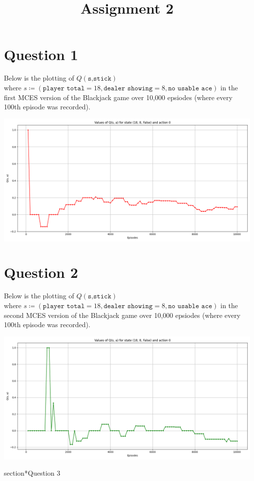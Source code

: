 \documentclass{article}
\title{Assignment 2}
\date{}
\author{}
\begin{document}
\maketitle
\section*{Question 1}
Below is the plotting of $Q(\texttt{s,stick})$\\ 
where $s\coloneq(\texttt{player total} = 18, \texttt{dealer showing} = 8, \texttt{no usable ace})$
in the first MCES version of the Blackjack game over 10,000 epsiodes (where every 100th episode was recorded).
\begin{center}
    \includegraphics[scale=0.5]{Q_values.png}
\end{center}
\section*{Question 2}
Below is the plotting of $Q(\texttt{s,stick})$\\ 
where $s\coloneq(\texttt{player total} = 18, \texttt{dealer showing} = 8, \texttt{no usable ace})$
in the second MCES version of the Blackjack game over 10,000 epsiodes (where every 100th episode was recorded).
\begin{center}
    \includegraphics[scale=0.5]{Q_values2.png}
\end{center}
section*{Question 3}
\end{document}

